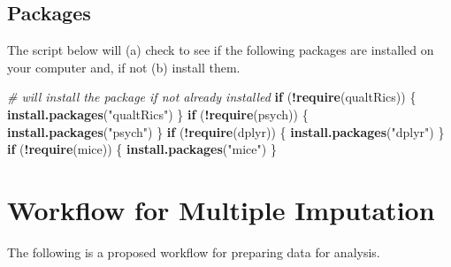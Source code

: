 \documentclass[
  11pt,
]{book}
\newenvironment{Shaded}{\begin{snugshade}}{\end{snugshade}}
\newcommand{\CommentTok}[1]{\textcolor[rgb]{0.37,0.37,0.37}{\textit{#1}}}
\newcommand{\ControlFlowTok}[1]{\textcolor[rgb]{0.27,0.27,0.27}{\textbf{#1}}}
\newcommand{\FunctionTok}[1]{\textcolor[rgb]{0.27,0.27,0.27}{\textbf{#1}}}
\newcommand{\NormalTok}[1]{#1}
\newcommand{\SpecialCharTok}[1]{\textcolor[rgb]{0.43,0.43,0.43}{\textbf{#1}}}
\newcommand{\StringTok}[1]{\textcolor[rgb]{0.5,0.5,0.5}{#1}}
\begin{document}
\hypertarget{packages-3}{%
\subsection{Packages}\label{packages-3}}

The script below will (a) check to see if the following packages are installed on your computer and, if not (b) install them.

\begin{Shaded}
\begin{Highlighting}[]
\CommentTok{\# will install the package if not already installed}
\ControlFlowTok{if}\NormalTok{ (}\SpecialCharTok{!}\FunctionTok{require}\NormalTok{(qualtRics)) \{}
    \FunctionTok{install.packages}\NormalTok{(}\StringTok{"qualtRics"}\NormalTok{)}
\NormalTok{\}}
\ControlFlowTok{if}\NormalTok{ (}\SpecialCharTok{!}\FunctionTok{require}\NormalTok{(psych)) \{}
    \FunctionTok{install.packages}\NormalTok{(}\StringTok{"psych"}\NormalTok{)}
\NormalTok{\}}
\ControlFlowTok{if}\NormalTok{ (}\SpecialCharTok{!}\FunctionTok{require}\NormalTok{(dplyr)) \{}
    \FunctionTok{install.packages}\NormalTok{(}\StringTok{"dplyr"}\NormalTok{)}
\NormalTok{\}}
\ControlFlowTok{if}\NormalTok{ (}\SpecialCharTok{!}\FunctionTok{require}\NormalTok{(mice)) \{}
    \FunctionTok{install.packages}\NormalTok{(}\StringTok{"mice"}\NormalTok{)}
\NormalTok{\}}
\end{Highlighting}
\end{Shaded}

\hypertarget{workflow-for-multiple-imputation}{%
\section{Workflow for Multiple Imputation}\label{workflow-for-multiple-imputation}}

The following is a proposed workflow for preparing data for analysis.
\end{document}
